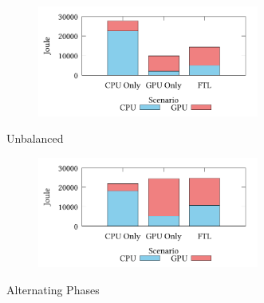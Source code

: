 \documentclass[8pt]{article}
\begin{document}
\setcounter{figure}{1}
\renewcommand{\thefigure}{\arabic{figure}b}
\begin{figure}[!h]
\centering
\begin{subfigure}[b]{\mysize}
\centering
\includegraphics[width=0.8\textwidth]{figures_original/balanced.energy.pdf}
\renewcommand{\thesubfigure}{Original}
\caption{}
\end{subfigure}
\begin{subfigure}[b]{\mysize}
\centering
{}
\renewcommand{\thesubfigure}{Reproduced}
\caption{}
\end{subfigure}
\caption{Unbalanced}
\end{figure}



\setcounter{figure}{1}
\renewcommand{\thefigure}{\arabic{figure}c}
\begin{figure}[!h]
\centering
\begin{subfigure}[b]{\mysize}
\centering
\includegraphics[width=0.8\textwidth]{figures_original/alternating.energy.pdf}
\renewcommand{\thesubfigure}{Original}
\caption{}
\end{subfigure}
\begin{subfigure}[b]{\mysize}
\centering
{}
\renewcommand{\thesubfigure}{Reproduced}
\caption{}
\end{subfigure}
\caption{Alternating Phases}
\end{figure}
\end{document}
